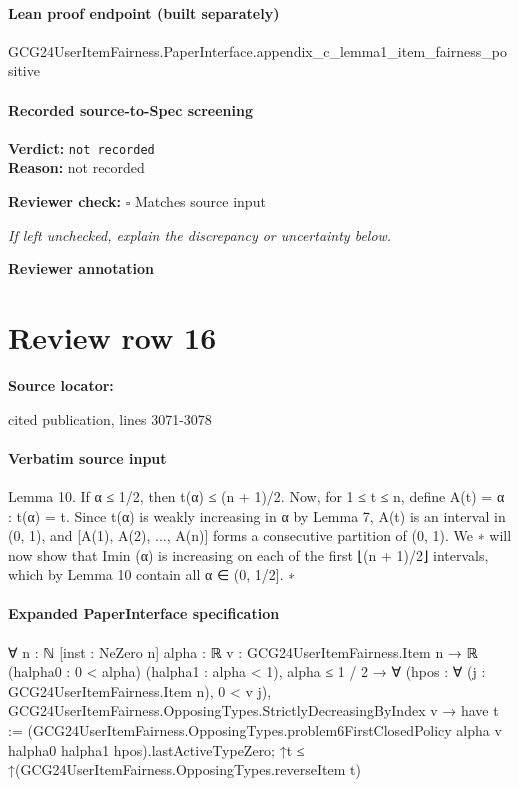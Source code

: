 \documentclass[10pt]{article}
\newcommand{\reviewerbox}{%
  \par\noindent\fbox{\parbox{0.96\linewidth}{\rule{0pt}{0.38in}}}\par
}
\newcommand{\reviewmatch}[1]{%
  \par\noindent\textbf{Reviewer check:} $\square$\; #1\par
  \noindent\emph{If left unchecked, explain the discrepancy or uncertainty below.}\par
}
\begin{document}
\paragraph{Lean proof endpoint (built separately)}\begin{ReviewVerbatim}
GCG24UserItemFairness.PaperInterface.appendix_c_lemma1_item_fairness_positive
\end{ReviewVerbatim}

\paragraph{Recorded source-to-Spec screening}
\textbf{Verdict:} \texttt{not recorded}
\\
\textbf{Reason:} not recorded
\reviewmatch{Matches source input}
\noindent\textbf{Reviewer annotation}\par
\reviewerbox
\clearpage
\hypertarget{source-claim-d461c27ad08b8393}{}
\section*{Review row 16}
\textbf{Source locator:} {\footnotesize\raggedright cited publication, lines 3071-\allowbreak{}3078\par}
\paragraph{Verbatim source input}
\begin{ReviewVerbatim}
Lemma 10. If α ≤ 1/2, then t(α) ≤ (n + 1)/2.
Now, for 1 ≤ t ≤ n, define A(t) = {α : t(α) = t}. Since t(α) is weakly increasing in α by Lemma
7, A(t) is an interval in (0, 1), and [A(1), A(2), ..., A(n)] forms a consecutive partition of (0, 1). We
∗
will now show that Imin
(α) is increasing on each of the first ⌊(n + 1)/2⌋ intervals, which by Lemma
10 contain all α ∈ (0, 1/2].
∗
\end{ReviewVerbatim}


\paragraph{Expanded PaperInterface specification}
\begin{ReviewVerbatim}
∀ {n : ℕ} [inst : NeZero n] {alpha : ℝ} {v : GCG24UserItemFairness.Item n → ℝ} (halpha0 : 0 < alpha)
  (halpha1 : alpha < 1),
  alpha ≤ 1 / 2 →
    ∀ (hpos : ∀ (j : GCG24UserItemFairness.Item n), 0 < v j),
      GCG24UserItemFairness.OpposingTypes.StrictlyDecreasingByIndex v →
        have t :=
          (GCG24UserItemFairness.OpposingTypes.problem6FirstClosedPolicy alpha v halpha0 halpha1
              hpos).lastActiveTypeZero;
        ↑t ≤ ↑(GCG24UserItemFairness.OpposingTypes.reverseItem t)
\end{ReviewVerbatim}
\end{document}

